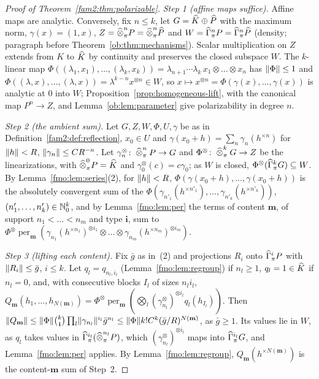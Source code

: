 \begin{proof}[Proof of Theorem~\ref{fam2:thm:polarizable}]
\emph{Step 1 (affine maps suffice).} Affine maps are analytic. Conversely, fix $n\le k$, let $G=\widehat K\oplus\widehat P$ with
the maximum norm, $\gamma(x)=(1,x)$, $Z=\mathbin{\widehat\otimes}^n_\pi P=\mathbin{\widehat\otimes}^n_\pi\widehat P$ and $W=\widehat\Gamma^n_\pi P=\widehat\Gamma^n_\pi\widehat P$
(density; paragraph before Theorem~\ref{ob:thm:mechanisms}). Scalar multiplication on $Z$ extends from $K$ to $\widehat K$
by continuity and preserves the closed subspace $W$. The $k$-linear map $\Phi((\lambda_1,x_1),\dots,(\lambda_k,x_k))=
\lambda_{n+1}\cdots\lambda_k\,x_1\otimes\dots\otimes x_n$ has $\lVert \Phi\rVert\le1$ and $\Phi((\lambda,x),\dots,(\lambda,x))=
\lambda^{k-n}x^{\otimes n}\in W$, so
$x\mapsto x^{\otimes n}=\Phi(\gamma(x),\dots,\gamma(x))$ is analytic at $0$ into $W$; Proposition~\ref{prop:homogeneous-lift},
with the canonical map $P^n\to Z$, and Lemma~\ref{ob:lem:parameter} give polarizability in degree $n$.

\emph{Step 2 (the ambient sum).} Let $G,Z,W,\Phi,U,\gamma$ be as in Definition~\ref{fam2:def:reflection}, $x_0\in U$ and
$\gamma(x_0+h)=\sum_n\gamma_n(h^{\times n})$ for $\lVert h\rVert<R$, $\lVert \gamma_n\rVert\le CR^{-n}$. Let $\gamma^\otimes_n\colon
\mathbin{\widehat\otimes}^n_\pi P\to G$ and $\Phi^\otimes\colon\mathbin{\widehat\otimes}^k_\pi G\to Z$ be the linearizations, with $\mathbin{\widehat\otimes}^0_\pi P=\widehat K$ and
$\gamma^\otimes_0(c)=c\gamma_0$; as $W$ is closed, $\Phi^\otimes(\widehat\Gamma^k_\pi G)\subseteq W$. By
Lemma~\ref{fmo:lem:series}(2), for $\lVert h\rVert<R$, $\Phi(\gamma(x_0+h),\dots,\gamma(x_0+h))$ is the absolutely convergent sum of
the $\Phi(\gamma_{n'_1}(h^{\times n'_1}),\dots,\gamma_{n'_k}(h^{\times n'_k}))$, $(n'_1,\dots,n'_k)\in\mathbb N_0^k$, and by
Lemma~\ref{fmo:lem:per} the terms of content $\mathbf m$, of support $n_1<\dots<n_m$ and type $\mathbf i$, sum to
$\Phi^\otimes\operatorname{per}_{\mathbf m}(\gamma_{n_1}(h^{\times n_1})^{\otimes i_1}\otimes\dots\otimes
\gamma_{n_m}(h^{\times n_m})^{\otimes i_m})$.

\emph{Step 3 (lifting each content).} Fix $\bar g$ as in~(2) and projections $R_i$ onto $\widehat\Gamma^i_\pi P$ with
$\lVert R_i\rVert\le\bar g$, $i\le k$. Let $q_l=q_{n_l,i_l}$ (Lemma~\ref{fmo:lem:regroup}) if $n_l\ge1$, $q_l=1\in\widehat K$ if $n_l=0$,
and, with consecutive blocks $I_l$ of sizes $n_li_l$, $Q_{\mathbf m}(h_1,\dots,h_{N(\mathbf m)})=\Phi^\otimes
\operatorname{per}_{\mathbf m}(\bigotimes_l(\gamma^\otimes_{n_l})^{\otimes i_l}q_l(h_{I_l}))$. Then $\lVert Q_{\mathbf m}\rVert\le
\lVert \Phi\rVert\binom k{\mathbf i}\prod_l\lVert \gamma_{n_l}\rVert^{i_l}\bar g^{n_l}\le\lVert \Phi\rVert k!C^k(\bar g/R)^{N(\mathbf m)}$, as
$\bar g\ge1$. Its values lie in $W$, as $q_l$ takes values in $\widehat\Gamma^{i_l}_\pi(\mathbin{\widehat\otimes}^{n_l}_\pi P)$, which
$(\gamma^\otimes_{n_l})^{\otimes i_l}$ maps into $\widehat\Gamma^{i_l}_\pi G$, and Lemma~\ref{fmo:lem:per} applies. By
Lemma~\ref{fmo:lem:regroup}, $Q_{\mathbf m}(h^{\times N(\mathbf m)})$ is the content-$\mathbf m$ sum of Step~2.


\end{proof}
